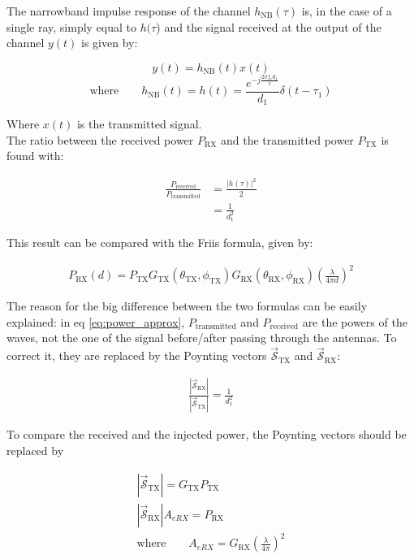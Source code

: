 \documentclass[10pt,a4paper]{ULBreport}
\begin{document}
The narrowband impulse response of the channel $h_{\text{NB}}(\tau)$ is, in the case of a single ray, simply equal to $h(\tau$) and the signal received at the output of the channel $y(t)$ is given by:

\begin{equation*}
    y(t) = h_{\text{NB}}(t) x(t)
\end{equation*}
\begin{equation*}
    \text{where} \qquad h_{\text{NB}}(t) = h(t) = \frac{e^{-j \frac{2\pi f_cd_1}{c}}}{d_1} \delta(t - \tau_1)
\end{equation*}

Where $x(t)$ is the transmitted signal. \\
The ratio between the received power $P_{\text{RX}}$ and the transmitted power $P_{\text{TX}}$ is found with:

\begin{align}
    \frac{P_{\text{received}}}{P_{\text{transmitted}}} &= \frac{\left| h(\tau) \right|^2}{2} \nonumber\\
    &= \frac{1}{d_1^2}
    \label{eq:power_approx}
\end{align}

This result can be compared with the Friis formula, given by:

\begin{align}
    P_{\text{RX}}(d) = P_{\text{TX}} G_{\text{TX}}(\theta_{\text{TX}}, \phi_{\text{TX}})G_{\text{RX}}(\theta_{\text{RX}}, \phi_{\text{RX}})\left(\frac{\lambda}{4\pi d}\right)^2
    \label{eq:friis_formula}
\end{align}

The reason for the big difference between the two formulas can be easily explained: in eq \ref{eq:power_approx}, $P_{\text{transmitted}}$ and $P_{\text{received}}$ are the powers of the waves, not the one of the signal before/after passing through the antennas. To correct it, they are replaced by the Poynting vectors $\bm{\vec{\mathscr{S}}}_{\text{TX}}$ and $\bm{\vec{\mathscr{S}}}_{\text{RX}}$:

\begin{align}
    \frac{\left|\bm{\vec{\mathscr{S}}}_{\text{RX}}\right|}{\left|\bm{\vec{\mathscr{S}}}_{\text{TX}}\right|} = \frac{1}{d_1^2}
    \label{eq:poynting}
\end{align}

To compare the received and the injected power, the Poynting vectors should be replaced by

\begin{align*}
    \left|\bm{\vec{\mathscr{S}}}_{\text{TX}}\right| = G_{\text{TX}} P_{\text{TX}}\\
    \left|\bm{\vec{\mathscr{S}}}_{\text{RX}}\right| A_{eRX} = P_{\text{RX}}\\
    \text{where} \quad \quad A_{eRX} = G_{\text{RX}}\left(\frac{\lambda}{4\pi}\right)^2
\end{align*}
\end{document}
